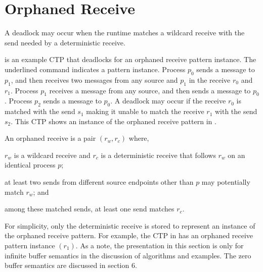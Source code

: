 \section{Orphaned Receive}


\examplefigone

A deadlock may occur when the runtime matches a wildcard receive with the send needed by a deterministic receive. 

 is an example CTP that deadlocks for an orphaned receive pattern instance. The underlined command indicates a pattern instance. Process $p_0$ sends a message to $p_1$, and then receives two messages from any source and $p_1$ in the receive $r_0$ and $r_1$. Process $p_1$ receives a message from any source, and then sends a message to $p_0$. Process $p_2$ sends a message to $p_0$.  
A deadlock may occur if the receive $\mathit{r_{0}}$ is matched with the send $\mathit{s_{1}}$ making it unable to match the receive $\mathit{r_{1}}$ with the send $\mathit{s_{2}}$. 
This CTP shows an instance of the orphaned receive pattern in . 

\begin{definition}
An orphaned receive is a pair $(\mathit{r_w}, \mathit{r_c})$ where, 
\begin{compactenum}
\item $\mathit{r_w}$ is a wildcard receive and $\mathit{r_c}$ is a deterministic receive that follows $\mathit{r_w}$ on an identical process $\mathit{p}$;
\item at least two sends from different source endpoints other than $\mathit{p}$ may potentially match $\mathit{r_w}$; and
\item among these matched sends, at least one send matches $\mathit{r_c}$. 
\end{compactenum}
\label{def:mismatch}
\end{definition}

For simplicity, only the deterministic receive is stored to represent an instance of the orphaned receive pattern. For example, the CTP in  has an orphaned receive pattern instance $(r_1)$.
As a note, the presentation in this section is only for infinite buffer semantics in the discussion of algorithms and examples. The zero buffer semantics are discussed in section 6.

